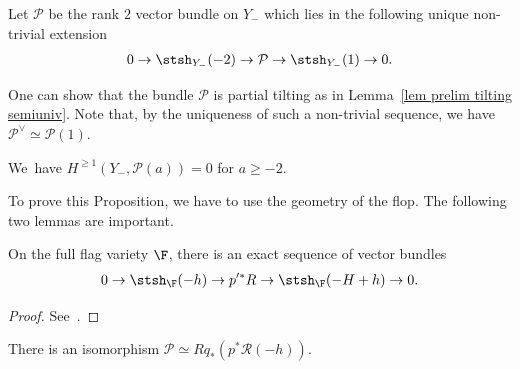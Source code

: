 \begin{Definition} \rm
Let $\mathcal{P}$ be the rank $2$ vector bundle on $Y_-$ which lies in the following unique non-trivial extension
\begin{gather*}
0 \to \stsh_{Y_-}(-2) \to \mathcal{P} \to \stsh_{Y_-}(1) \to 0.
\end{gather*}
\end{Definition}

One can show that the bundle $\mathcal{P}$ is partial tilting as in Lemma~\ref{lem prelim tilting semiuniv}.
Note that, by the uniqueness of such a non-trivial sequence, we have $\mathcal{P}^{\vee} \simeq \mathcal{P}(1)$.

\begin{Proposition} \label{prop minus 2}
We~have $H^{\geq 1}(Y_-, \mathcal{P}(a)) = 0$ for $a \geq -2$.
\end{Proposition}

To prove this Proposition, we have to use the geometry of the flop.
The following two lemmas are important.

\begin{Lemma}
On the full flag variety $\F$, there is an exact sequence of vector bundles
\begin{gather*}
0 \to \stsh_{\F}(-h) \to p'^*R \to \stsh_{\F}(-H+h) \to 0.
\end{gather*}
\end{Lemma}

\begin{proof}
See~\cite{Kuz18}.
\end{proof}

\begin{Lemma} \label{lem minus 3}
There is an isomorphism $\mathcal{P} \simeq Rq_*(p^*\mathcal{R}(-h))$.
\end{Lemma}

